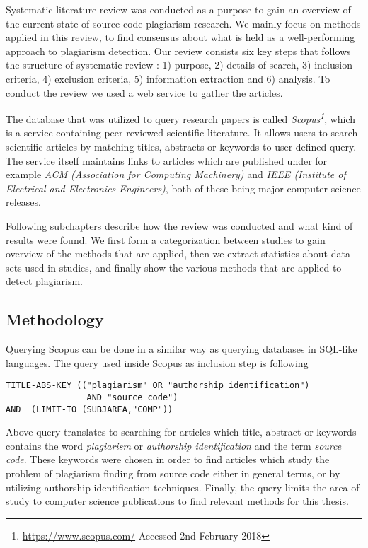 Systematic literature review was conducted as a purpose to gain an overview of the current state of source code plagiarism research. We mainly focus on methods applied in this review, to find consensus about what is held as a well-performing approach to plagiarism detection. Our review consists six key steps that follows the structure of systematic review \cite{AGCSLRIS2010}: 1) purpose, 2) details of search, 3) inclusion criteria, 4) exclusion criteria, 5) information extraction and 6) analysis. To conduct the review we used a web service to gather the articles.


The database that was utilized to query research papers is called \emph{Scopus\footnote{\url{https://www.scopus.com/} Accessed 2nd February 2018}}, which is a service containing peer-reviewed scientific literature. It allows users to search scientific articles by matching \eg titles, abstracts or keywords to user-defined query. The service itself maintains links to articles which are published under for example \emph{ACM (Association for Computing Machinery)} and \emph{IEEE (Institute of Electrical and Electronics Engineers)}, both of these being major computer science releases. 

Following subchapters describe how the review was conducted and what kind of results were found. We first form a categorization between studies to gain overview of the methods that are applied, then we extract statistics about data sets used in studies, and finally show the various methods that are applied to detect plagiarism. 

\subsection{Methodology}

Querying Scopus can be done in a similar way as querying databases in SQL-like languages. The query used inside Scopus as inclusion step is following
\begin{verbatim}
TITLE-ABS-KEY (("plagiarism" OR "authorship identification")  
                AND "source code") 
AND  (LIMIT-TO (SUBJAREA,"COMP"))
\end{verbatim}

\noindent
Above query translates to searching for articles which title, abstract or keywords contains the word \emph{plagiarism} or \emph{authorship identification} and the term \emph{source code}. These keywords were chosen in order to find articles which study the problem of plagiarism finding from source code either in general terms, or by utilizing authorship identification techniques. Finally, the query limits the area of study to computer science publications to find relevant methods for this thesis. 

